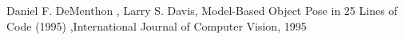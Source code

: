 \documentclass[letterpaper, 10 pt, conference]{IEEEconf}  %
\begin{document}










\begin{thebibliography}{99}

   Daniel F. DeMenthon , Larry S. Davis, Model-Based Object Pose in 25 Lines of Code (1995) ,International Journal of Computer Vision, 1995
 \end{thebibliography}
\end{document}
